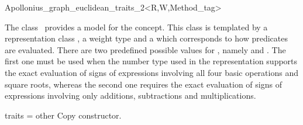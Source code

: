 

\begin{ccRefClass}{Apollonius_graph_euclidean_traits_2<R,W,Method_tag>}

\ccDefinition
  
The class \ccRefName\ provides a model for the
 concept.
This class is templated by a representation class ,
a weight type  and a  which
corresponds to how predicates are evaluated. There are two predefined
possible values for , namely  and
. The first one must be used when the number
type used in the representation supports the exact evaluation of signs
of expressions involving all four basic operations and 
square roots, whereas the second one requires the exact evaluation of
signs of expressions involving only additions, subtractions and
multiplications. 


\ccIsModel
{}

\ccCreation
{}
{traits = other}{}
\ccThreeToTwo
%
\ccGlue
{}
{Copy constructor.}
\ccGlue
{}


\ccSeeAlso
{} \\


\end{ccRefClass}


